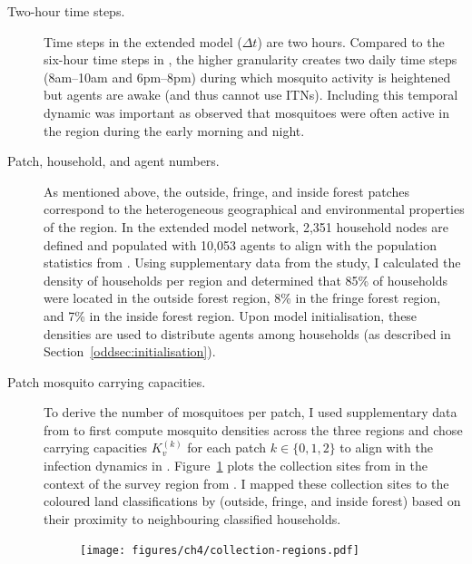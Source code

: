 \begin{description}
    \item[Two-hour time steps.] Time steps in the extended model ($\Delta t$) are two hours. Compared to the six-hour time steps in \citet{manore_network-patch_2015}, the higher granularity creates two daily time steps (8am--10am and 6pm--8pm) during which mosquito activity is heightened but agents are awake (and thus cannot use ITNs). Including this temporal dynamic was important as \citet{pepey_mobility_2022} observed that mosquitoes were often active in the region  during the early morning and night.
    \item[Patch, household, and agent numbers.] As mentioned above, the outside, fringe, and inside forest patches correspond to the heterogeneous geographical and environmental properties of the region. In the extended model network, 2,351 household nodes are defined and populated with 10,053 agents to align with the population statistics from \citet{sandfort_forest_2020}. Using supplementary data from the study, I calculated the density of households per region and determined that 85\% of households were located in the outside forest region, 8\% in the fringe forest region, and 7\% in the inside forest region. Upon model initialisation, these densities are used to distribute agents among households (as described in Section~\ref{oddsec:initialisation}).
    \item[Patch mosquito carrying capacities.] To derive the number of mosquitoes per patch, I used supplementary data from \citet{vantaux_anopheles_2021} to first compute mosquito densities across the three regions and chose carrying capacities $K_v^{(k)}$ for each patch $k\in\{0,1,2\}$ to align with the infection dynamics in \citet{manore_network-patch_2015}. Figure~\ref{fig:collection-sites} plots the collection sites from \citet{vantaux_anopheles_2021} in the context of the survey region from \citet{sandfort_forest_2020}. I mapped these collection sites to the coloured land classifications by \citet{sandfort_forest_2020} (outside, fringe, and inside forest) based on their proximity to neighbouring classified households.

    \begin{figure}[hbt!]
         \centering
         \texttt{[image: figures/ch4/collection-regions.pdf]}
        \label{fig:collection-sites}
    \end{figure}


\end{description}
